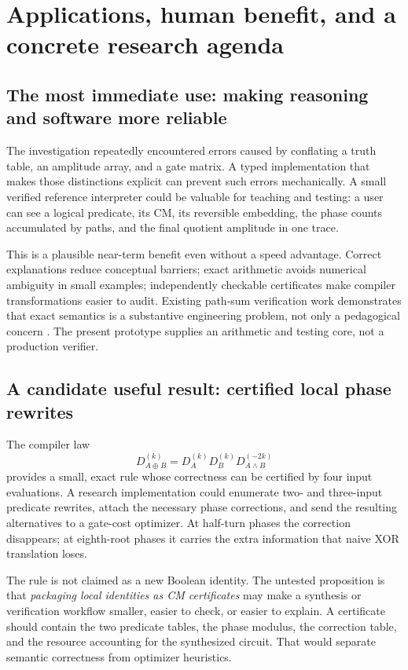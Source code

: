 \section{Applications, human benefit, and a concrete research agenda}\label{sec:applications}
\subsection{The most immediate use: making reasoning and software more reliable}
The investigation repeatedly encountered errors caused by conflating a truth table, an amplitude array, and a gate matrix. A typed implementation that makes those distinctions explicit can prevent such errors mechanically. A small verified reference interpreter could be valuable for teaching and testing: a user can see a logical predicate, its CM, its reversible embedding, the phase counts accumulated by paths, and the final quotient amplitude in one trace.

This is a plausible near-term benefit even without a speed advantage. Correct explanations reduce conceptual barriers; exact arithmetic avoids numerical ambiguity in small examples; independently checkable certificates make compiler transformations easier to audit. Existing path-sum verification work demonstrates that exact semantics is a substantive engineering problem, not only a pedagogical concern \cite{amy2019,amy2023}. The present prototype supplies an arithmetic and testing core, not a production verifier.

\subsection{A candidate useful result: certified local phase rewrites}
The compiler law
\begin{equation}
 D_{A\oplus B}^{(k)}=D_A^{(k)}D_B^{(k)}D_{A\land B}^{(-2k)}
\end{equation}
provides a small, exact rule whose correctness can be certified by four input evaluations. A research implementation could enumerate two- and three-input predicate rewrites, attach the necessary phase corrections, and send the resulting alternatives to a gate-cost optimizer. At half-turn phases the correction disappears; at eighth-root phases it carries the extra information that naive XOR translation loses.

The rule is not claimed as a new Boolean identity. The untested proposition is that \emph{packaging local identities as CM certificates} may make a synthesis or verification workflow smaller, easier to check, or easier to explain. A certificate should contain the two predicate tables, the phase modulus, the correction table, and the resource accounting for the synthesized circuit. That would separate semantic correctness from optimizer heuristics.

